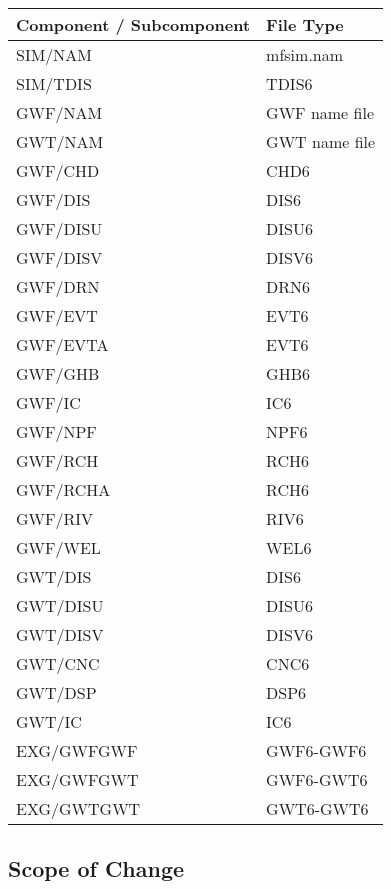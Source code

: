 \begin{table}[H]
\caption{Components and subcomponents that are read using Input Data Processor (IDP) routines}
\small
\begin{center}
\begin{longtable}{p{6cm} p{4cm}}
\hline
\hline
\textbf{Component / Subcomponent} & \textbf{File Type} \\
\hline
SIM/NAM & mfsim.nam \\
SIM/TDIS & TDIS6 \\
GWF/NAM & GWF name file \\
GWT/NAM & GWT name file \\
GWF/CHD & CHD6 \\
GWF/DIS & DIS6 \\
GWF/DISU & DISU6 \\
GWF/DISV & DISV6 \\
GWF/DRN & DRN6 \\
GWF/EVT & EVT6 \\
GWF/EVTA & EVT6 \\
GWF/GHB & GHB6 \\
GWF/IC & IC6 \\
GWF/NPF & NPF6 \\
GWF/RCH & RCH6 \\
GWF/RCHA & RCH6 \\
GWF/RIV & RIV6 \\
GWF/WEL & WEL6 \\
GWT/DIS & DIS6 \\
GWT/DISU & DISU6 \\
GWT/DISV & DISV6 \\
GWT/CNC & CNC6 \\
GWT/DSP & DSP6 \\
GWT/IC & IC6 \\
EXG/GWFGWF & GWF6-GWF6 \\
EXG/GWFGWT & GWF6-GWT6 \\
EXG/GWTGWT & GWT6-GWT6 \\
\hline
\end{longtable}
\label{table:idmsupported}
\end{center}
\normalsize
\end{table}

\subsection{Scope of Change}


